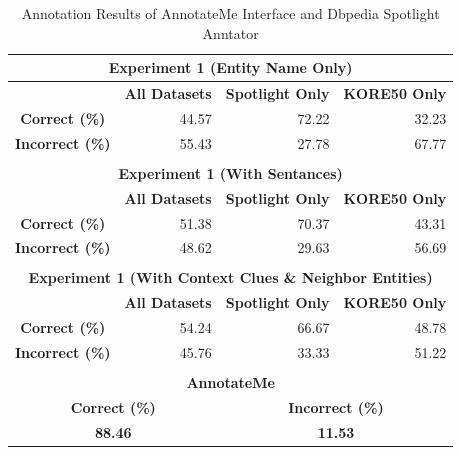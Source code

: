 \begin{table}[htbp]
  \centering
  \caption{Annotation Results of AnnotateMe Interface and Dbpedia Spotlight Anntator}
    \begin{tabular}{|cc|cc|}
    \toprule
    \multicolumn{4}{|c|}{\textbf{Experiment 1 (Entity Name Only)}} \\
    \midrule
    \multicolumn{1}{|r|}{} & \multicolumn{1}{l|}{\textbf{All Datasets}} & \multicolumn{1}{l|}{\textbf{Spotlight Only}} & \multicolumn{1}{l|}{\textbf{KORE50 Only}} \\
    \midrule
    \multicolumn{1}{|c|}{\textbf{Correct (\%)}} & \multicolumn{1}{r|}{44.57} & \multicolumn{1}{r|}{72.22} & \multicolumn{1}{r|}{32.23} \\
    \multicolumn{1}{|c|}{\textbf{Incorrect (\%)}} & \multicolumn{1}{r|}{55.43} & \multicolumn{1}{r|}{27.78} & \multicolumn{1}{r|}{67.77} \\
    \midrule
    \multicolumn{4}{|c|}{} \\
    \midrule
    \multicolumn{4}{|c|}{\textbf{Experiment 1 (With Sentances)}} \\
    \midrule
    \multicolumn{1}{|r|}{} & \multicolumn{1}{l|}{\textbf{All Datasets}} & \multicolumn{1}{l|}{\textbf{Spotlight Only}} & \multicolumn{1}{l|}{\textbf{KORE50 Only}} \\
    \midrule
    \multicolumn{1}{|c|}{\textbf{Correct (\%)}} & \multicolumn{1}{r|}{51.38} & \multicolumn{1}{r|}{70.37} & \multicolumn{1}{r|}{43.31} \\
    \multicolumn{1}{|c|}{\textbf{Incorrect (\%)}} & \multicolumn{1}{r|}{48.62} & \multicolumn{1}{r|}{29.63} & \multicolumn{1}{r|}{56.69} \\
    \midrule
    \multicolumn{4}{c}{} \\
    \midrule
    \multicolumn{4}{|c|}{\textbf{Experiment 1 (With Context Clues \& Neighbor Entities)}} \\
    \midrule
    \multicolumn{1}{|r|}{} & \multicolumn{1}{l|}{\textbf{All Datasets}} & \multicolumn{1}{l|}{\textbf{Spotlight Only}} & \multicolumn{1}{l|}{\textbf{KORE50 Only}} \\
    \midrule
    \multicolumn{1}{|c|}{\textbf{Correct (\%)}} & \multicolumn{1}{r|}{54.24} & \multicolumn{1}{r|}{66.67} & \multicolumn{1}{r|}{48.78} \\
    \multicolumn{1}{|c|}{\textbf{Incorrect (\%)}} & \multicolumn{1}{r|}{45.76} & \multicolumn{1}{r|}{33.33} & \multicolumn{1}{r|}{51.22} \\
    \midrule
    \multicolumn{4}{|c|}{} \\
    \midrule
    \multicolumn{4}{|c|}{\textcolor[rgb]{ 1,  0,  0}{\textbf{AnnotateMe}}} \\
    \midrule
    \multicolumn{2}{|c|}{\textcolor[rgb]{ 1,  0,  0}{\textbf{Correct (\%)}}} & \multicolumn{2}{c|}{\textcolor[rgb]{ 1,  0,  0}{\textbf{Incorrect (\%)}}} \\
    \midrule
    \multicolumn{2}{|c|}{\textcolor[rgb]{ 1,  0,  0}{\textbf{88.46}}} & \multicolumn{2}{c|}{\textcolor[rgb]{ 1,  0,  0}{\textbf{11.53}}} \\
    \bottomrule
    \end{tabular}%
  \label{tab:exp1-annotatorRes}%
\end{table}%


